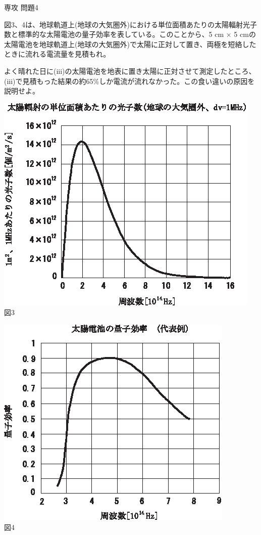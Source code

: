 \documentclass[fleqn]{jbook}
\begin{document}
\begin{question}{専攻 問題4}{}
\begin{subquestions}
\begin{subsubquestions}
\SubSubQuestion
図3、4は、地球軌道上(地球の大気圏外)における単位面積あたりの太陽輻射光子数と標準的な太陽電池の量子効率を表している。このことから、5 cm $\times$ 5 cmの太陽電池を地球軌道上(地球の大気圏外)で太陽に正対して置き、両極を短絡したときに流れる電流量を見積もれ。

\SubSubQuestion
よく晴れた日に(iii)の太陽電池を地表に置き太陽に正対させて測定したところ、(iii)で見積もった結果の約65\%しか電流が流れなかった。この食い違いの原因を説明せよ。\\

\begin{minipage}{.5\linewidth}
\begin{center}
\includegraphics[clip]{1999phy4-3.eps}\\
図3
\end{center}
\end{minipage}
\begin{minipage}{.5\linewidth}
\begin{center}
\includegraphics[clip]{1999phy4-4.eps}\\
図4
\end{center}
\end{minipage}
\end{subsubquestions}


\end{subquestions}
\end{question}
\end{document}

